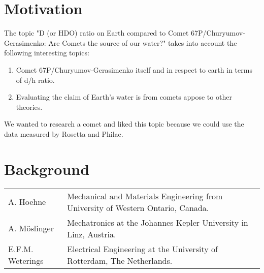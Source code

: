 \documentclass[11pt]{article}
\begin{document}


\section{Motivation}
The topic "D (or HDO) ratio on Earth compared to Comet 67P/Churyumov-Gerasimenko: Are Comets the source of our water?" takes into account the following interesting topics:

\begin{enumerate}
	\item Comet 67P/Churyumov-Gerasimenko itself and in respect to earth in terms of d/h ratio.
	\item Evaluating the claim of Earth's water is from comets appose to other theories.
\end{enumerate}

We wanted to research a comet and liked this topic because we could use the data measured by Rosetta and Philae. 


\section{Background}
\begin{tabular}{l l}
A. Hoehne & Mechanical and Materials Engineering from University of Western Ontario, Canada.\\
A. M\"{o}slinger & Mechatronics at the Johannes Kepler University in Linz, Austria.\\
E.F.M. Weterings & Electrical Engineering at the University of Rotterdam, The Netherlands.
\end{tabular}
\end{document}
